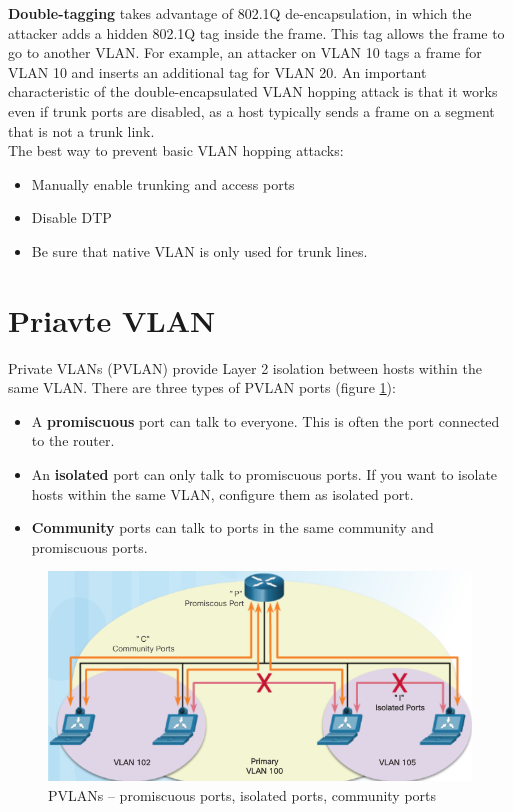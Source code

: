\textbf{Double-tagging} takes advantage of 802.1Q de-encapsulation, in which the attacker adds a hidden 802.1Q tag inside the frame. This tag allows the frame to go to another VLAN. For example, an attacker on VLAN 10 tags a frame for VLAN 10 and inserts an additional tag for VLAN 20.  An important characteristic of the double-encapsulated VLAN hopping attack is that it works even if trunk ports are disabled, as a host typically sends a frame on a segment that is not a trunk link. \\

The best way to prevent basic VLAN hopping attacks:

\begin{itemize}
\item Manually enable trunking and access ports
\item Disable DTP
\item Be sure that native VLAN is only used for trunk lines.
\end{itemize}

\section{Priavte VLAN}

Private VLANs (PVLAN) provide Layer 2 isolation between hosts within the same VLAN. There are three types of PVLAN ports (figure \ref{PVLAN}):

\begin{itemize}
\item A \textbf{promiscuous} port can talk to everyone. This is often the port connected to the router.
\item An \textbf{isolated} port can only talk to promiscuous ports. If you want to isolate hosts within the same VLAN, configure them as isolated port.
\item \textbf{Community} ports can talk to ports in the same community and promiscuous ports.
\end{itemize}

\begin{figure}[hbtp]
\caption{PVLANs -- promiscuous ports, isolated ports, community ports}\label{PVLAN}
\centering
\includegraphics[scale=0.5]{pictures/PVLAN.PNG}
\end{figure}


